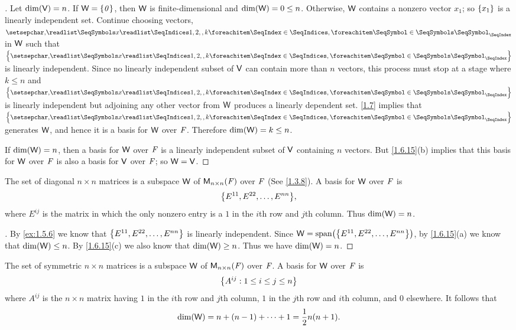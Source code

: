 \begin{proof}[]
	Let \(\dim(\mathsf{V}) = n\).
	If \(\mathsf{W} = \left\lbrace\mathit{0}\right\rbrace\), then \(\mathsf{W}\) is finite-dimensional and \(\dim(\mathsf{W}) = 0 \leq n\).
	Otherwise, \(\mathsf{W}\) contains a nonzero vector \(x_1\);
	so \(\left\lbrace x_1\right\rbrace\) is a linearly independent set.
	Continue choosing vectors, \(\seq{x}{1,2,,k}\) in \(\mathsf{W}\) such that \(\set{\seq{x}{1,2,,k}}\) is linearly independent.
	Since no linearly independent subset of \(\mathsf{V}\) can contain more than \(n\) vectors, this process must stop at a stage where \(k \leq n\) and \(\set{\seq{x}{1,2,,k}}\) is linearly independent but adjoining any other vector from \(\mathsf{W}\) produces a linearly dependent set.
	\cref{1.7} implies that \(\set{\seq{x}{1,2,,k}}\) generates \(\mathsf{W}\), and hence it is a basis for \(\mathsf{W}\) over \(\mathit{F}\).
	Therefore \(\dim(\mathsf{W}) = k \leq n\).

	If \(\dim(\mathsf{W}) = n\), then a basis for \(\mathsf{W}\) over \(\mathit{F}\) is a linearly independent subset of \(\mathsf{V}\) containing \(n\) vectors.
	But \cref{1.6.15}(b) implies that this basis for \(\mathsf{W}\) over \(\mathit{F}\) is also a basis for \(\mathsf{V}\) over \(\mathit{F}\);
	so \(\mathsf{W} = \mathsf{V}\).
\end{proof}

\begin{eg}\label{1.6.17}
	The set of diagonal \(n \times n\) matrices is a subspace \(\mathsf{W}\) of \(\ms[n][n][\F]\) over \(\mathit{F}\)
	(See \cref{1.3.8}).
	A basis for \(\mathsf{W}\) over \(\mathit{F}\) is
	\[
		\set{E^{1 1}, E^{2 2}, \dots, E^{n n}},
	\]
	where \(E^{i j}\) is the matrix in which the only nonzero entry is a \(1\) in the \(i\)th row and \(j\)th column.
	Thus \(\dim(\mathsf{W}) = n\).
\end{eg}

\begin{proof}[]
	By \cref{ex:1.5.6} we know that \(\left\lbrace E^{1 1}, E^{2 2}, \dots, E^{n n}\right\rbrace\) is linearly independent.
	Since \(\W = \spn{\set{E^{1 1}, E^{2 2}, \dots, E^{n n}}}\), by \cref{1.6.15}(a) we know that \(\dim(\mathsf{W}) \leq n\).
	By \cref{1.6.15}(c) we also know that \(\dim(\mathsf{W}) \geq n\).
	Thus we have \(\dim(\mathsf{W}) = n\).
\end{proof}

\begin{eg}\label{1.6.18}
	The set of symmetric \(n \times n\) matrices is a subspace \(\mathsf{W}\) of \(\ms[n][n][\F]\) over \(\mathit{F}\).
	A basis for \(\mathsf{W}\) over \(\mathit{F}\) is
	\[
		\left\lbrace A^{i j} : 1 \leq i \leq j \leq n\right\rbrace
	\]
	where \(A^{i j}\) is the \(n \times n\) matrix having \(1\) in the \(i\)th row and \(j\)th column, \(1\) in the \(j\)th row and \(i\)th column, and \(0\) elsewhere.
	It follows that
	\[
		\dim(\mathsf{W}) = n + (n - 1) + \cdots + 1 = \frac{1}{2} n(n + 1).
	\]
\end{eg}

